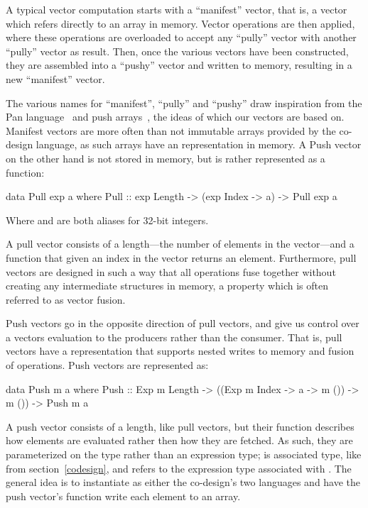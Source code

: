 \documentclass[../paper.tex]{subfiles}
\begin{document}
A typical vector computation starts with a ``manifest'' vector, that is, a vector which refers directly to an array in memory. Vector operations are then applied, where these operations are overloaded to accept any ``pully'' vector with another ``pully'' vector as result. Then, once the various vectors have been constructed, they are assembled into a ``pushy'' vector and written to memory, resulting in a new ``manifest'' vector.

The various names for ``manifest'', ``pully'' and ``pushy'' draw inspiration from the Pan language~\cite{} and push arrays~\cite{}, the ideas of which our vectors are based on. Manifest vectors are more often than not immutable arrays provided by the co-design language, as such arrays have an representation in memory. A Push vector on the other hand is not stored in memory, but is rather represented as a function:

\begin{code}
data Pull exp a where
  Pull :: exp Length -> (exp Index -> a) -> Pull exp a
\end{code}

\noindent Where  and  are both aliases for 32-bit integers.

A pull vector consists of a length---the number of elements in the vector---and a function that given an index in the vector returns an element. Furthermore, pull vectors are designed in such a way that all operations fuse together without creating any intermediate structures in memory, a property which is often referred to as vector fusion.


Push vectors go in the opposite direction of pull vectors, and give us control over a vectors evaluation to the producers rather than the consumer. That is, pull vectors have a representation that supports nested writes to memory and fusion of operations. Push vectors are represented as:


\begin{code}
data Push m a where
  Push :: Exp m Length -> ((Exp m Index -> a -> m ()) -> m ()) -> Push m a
\end{code}

A push vector consists of a length, like pull vectors, but their function describes how elements are evaluated rather then how they are fetched. As such, they are parameterized on the type  rather than an expression type;  is associated type, like  from section~\ref{codesign}, and refers to the expression type associated with . The general idea is to instantiate  as either the co-design's two languages and have the push vector's function write each element to an array.
\end{document}
